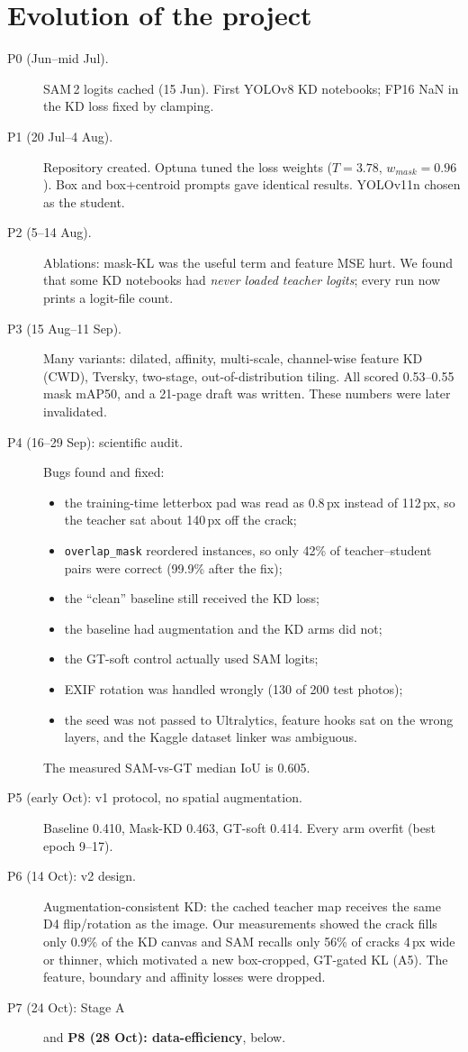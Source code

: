 \documentclass[11pt,a4paper]{article}
\begin{document}
\section{Evolution of the project}
\begin{description}
\item[P0 (Jun--mid Jul).] SAM\,2 logits cached (15 Jun). First YOLOv8 KD notebooks; FP16 NaN in the KD loss fixed by clamping.
\item[P1 (20 Jul--4 Aug).] Repository created. Optuna tuned the loss weights ($T{=}3.78$, $w_{mask}{=}0.96$). Box and box+centroid prompts gave identical results. YOLOv11n chosen as the student.
\item[P2 (5--14 Aug).] Ablations: mask-KL was the useful term and feature MSE hurt. We found that some KD notebooks had \emph{never loaded teacher logits}; every run now prints a logit-file count.
\item[P3 (15 Aug--11 Sep).] Many variants: dilated, affinity, multi-scale, channel-wise feature KD (CWD), Tversky, two-stage, out-of-distribution tiling. All scored 0.53--0.55 mask mAP50, and a 21-page draft was written. These numbers were later invalidated.
\item[P4 (16--29 Sep): scientific audit.] Bugs found and fixed:
 \begin{itemize}
 \item the training-time letterbox pad was read as 0.8\,px instead of 112\,px, so the teacher sat about 140\,px off the crack;
 \item \texttt{overlap\_mask} reordered instances, so only 42\% of teacher--student pairs were correct (99.9\% after the fix);
 \item the ``clean'' baseline still received the KD loss;
 \item the baseline had augmentation and the KD arms did not;
 \item the GT-soft control actually used SAM logits;
 \item EXIF rotation was handled wrongly (130 of 200 test photos);
 \item the seed was not passed to Ultralytics, feature hooks sat on the wrong layers, and the Kaggle dataset linker was ambiguous.
 \end{itemize}
 The measured SAM-vs-GT median IoU is 0.605.
\item[P5 (early Oct): v1 protocol, no spatial augmentation.] Baseline 0.410, Mask-KD 0.463, GT-soft 0.414. Every arm overfit (best epoch 9--17).
\item[P6 (14 Oct): v2 design.] Augmentation-consistent KD: the cached teacher map receives the same D4 flip/rotation as the image. Our measurements showed the crack fills only 0.9\% of the KD canvas and SAM recalls only 56\% of cracks 4\,px wide or thinner, which motivated a new box-cropped, GT-gated KL (A5). The feature, boundary and affinity losses were dropped.
\item[P7 (24 Oct): Stage A] and \textbf{P8 (28 Oct): data-efficiency}, below.
\end{description}
\end{document}
